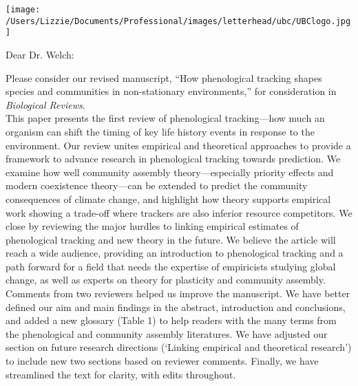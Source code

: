 \documentclass[11pt,a4paper]{letter}
\begin{document}
\begin{letter}{}
    \begin{flushright}
\texttt{[image: /Users/Lizzie/Documents/Professional/images/letterhead/ubc/UBClogo.jpg]}\\
    \end{flushright}
\opening{Dear Dr. Welch:}
Please consider our revised manuscript, ``How phenological tracking shapes species and communities in non-stationary environments,'' for consideration in \emph{Biological Reviews}.
\vspace{1.5ex}\\
This paper presents the first review of phenological tracking---how much an organism can shift the timing of key life history events in response to the environment. %
Our review unites empirical and theoretical approaches to provide a framework to advance research in phenological tracking towards prediction. We examine how well community assembly theory---especially priority effects and modern coexistence theory---can be extended to predict the community consequences of climate change, and highlight how theory supports empirical work showing a trade-off where trackers are also inferior resource competitors. We close by reviewing the major hurdles to linking empirical estimates of phenological tracking and new theory in the future. We believe the article will reach a wide audience, providing an introduction to phenological tracking and a path forward for a field that needs the expertise of empiricists studying global change, as well as experts on theory for plasticity and community assembly.
\vspace{1.5ex}\\
Comments from two reviewers helped us improve the manuscript. We have better defined our aim and main findings in the abstract, introduction and conclusions, and added a new glossary (Table 1) to help readers with the many terms from the phenological and community assembly literatures. We have adjusted our section on future research directions (`Linking empirical and theoretical research') to include new two sections based on reviewer comments. Finally, we have streamlined the text for clarity, with edits throughout. 

\end{letter}
\end{document}
